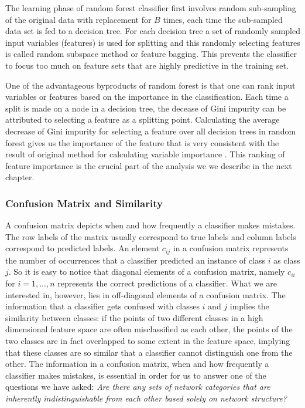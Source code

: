 \documentclass{article}
\begin{document}
The learning phase of random forest classifier first involves random sub-sampling of the original data with replacement for $B$ times, each time the sub-sampled data set is fed to a decision tree. For each decision tree a set of randomly sampled input variables (features) is used for splitting and this randomly selecting features is called random subspace method or feature bagging. This prevents the classifier to focus too much on feature sets that are highly predictive in the training set. 

One of the advantageous byproducts of random forest is that one can rank input variables or features based on the importance in the classification. Each time a split is made on a node in a decision tree, the decease of Gini impurity can be attributed to selecting a feature as a splitting point.  Calculating the average decrease of Gini impurity for selecting a feature over all decision trees in random forest gives us the importance of the feature that is very consistent with the result of original method for calculating variable importance \cite{RandomForest,RandomForestOnline}. This ranking of feature importance is the crucial part of the analysis we we describe in the next chapter.


		\subsubsection{Confusion Matrix and Similarity}
	A confusion matrix depicts when and how frequently a classifier makes mistakes. The row labels of the matrix usually correspond to  true labels and column labels correspond to predicted labels. An element $c_{ij}$ in a confusion matrix represents the number of occurrences that a classifier predicted an instance of class $i$ as class $j$. So it is easy to notice that diagonal elements of a confusion matrix, namely $c_{ii}$ for $i = 1,...,n$ represents the correct predictions of a classifier. What we are interested in, however, lies in off-diagonal elements of a confusion matrix. The information that a classifier gets confused with classes $i$ and $j$ implies the similarity between classes: if the points of two different classes in a high dimensional feature space are often misclassified as each other, the points of the two classes are in fact overlapped to some extent in the feature space, implying that these classes are so similar that a classifier cannot distinguish one from the other. The information in a confusion matrix, when and how frequently a classifier makes mistakes, is essential in order for us to answer one of the questions we have asked: \textit{Are there any sets of network categories that are inherently indistinguishable from each other based solely on network structure?}
\end{document}
